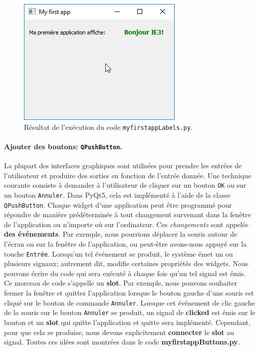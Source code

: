 \documentclass[%
oneside,                 %
final,                   %
10pt,french]{article}
\begin{document}
\begin{figure}[!ht]  %
  \centerline{\includegraphics[width=0.7\linewidth]{imgs/myfirstappLabels.png}}
  \caption{
  Résultat de l'exécution du code \texttt{myfirstappLabels.py}. \label{fig:myfirstappLabels}
  }
\end{figure}


\paragraph{Ajouter des boutons: \texttt{QPushButton}.}
La plupart des interfaces graphiques sont utilisées pour prendre les entrées de l'utilisateur et produire des sorties en fonction de l'entrée donnée. Une technique courante consiste à demander à l'utilisateur de cliquer sur un bouton \texttt{OK} ou sur un bouton \texttt{Annuler}. Dans PyQt5, cela est implémenté à l'aide de la classe \texttt{QPushButton}. Chaque widget d'une application peut être programmé pour répondre de manière prédéterminée à tout changement survenant dans la fenêtre de l'application ou n'importe où sur l'ordinateur. Ces \emph{changements} sont appelés \textbf{des événements}. Par exemple, nous pourrions déplacer la souris autour de l'écran ou sur la fenêtre de l'application, ou peut-être avons-nous appuyé sur la touche \texttt{Entrée}. Lorsqu'un tel événement se produit, le système émet un ou plusieurs signaux; autrement dit, modifie certaines propriétés des widgets. Nous pouvons écrire du code qui sera exécuté à chaque fois qu'un tel signal est émis. Ce morceau de code s'appelle un \textbf{slot}. Par exemple, nous pouvons souhaiter fermer la fenêtre et quitter l’application lorsque le bouton gauche d’une souris est cliqué sur le bouton de commande \texttt{Annuler}. Lorsque cet événement de clic gauche de la souris sur le bouton \texttt{Annuler} se produit, un signal de \textbf{clicked} est émis sur le bouton et un \textbf{slot} qui quitte l'application et quitte sera implémenté. Cependant, pour que cela se produise, nous devons explicitement \textbf{connecter} le \textbf{slot} au signal. Toutes ces idées sont montrées dans le code \textbf{myfirstappButtons.py}.
\end{document}
